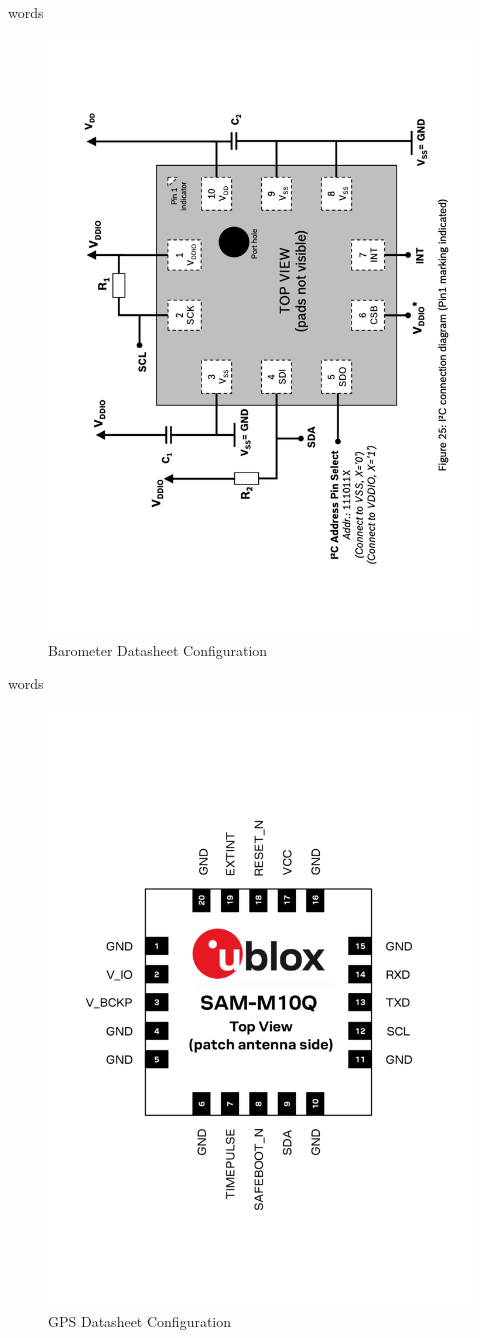 \documentclass{report}
\begin{document}
            words
            \begin{figure}[H]
                \centering
                \includegraphics[width=0.4\linewidth, angle=270]{figures/BARO_DS.pdf}
                \caption{Barometer Datasheet Configuration}
                \label{fig:baro_ds}
            \end{figure}

            words
            \begin{figure}[H]
                \centering
                \includegraphics[width=0.4\linewidth]{figures/GPS_DS.pdf}
                \caption{GPS Datasheet Configuration}
                \label{fig:gps_ds}
            \end{figure}
\end{document}
